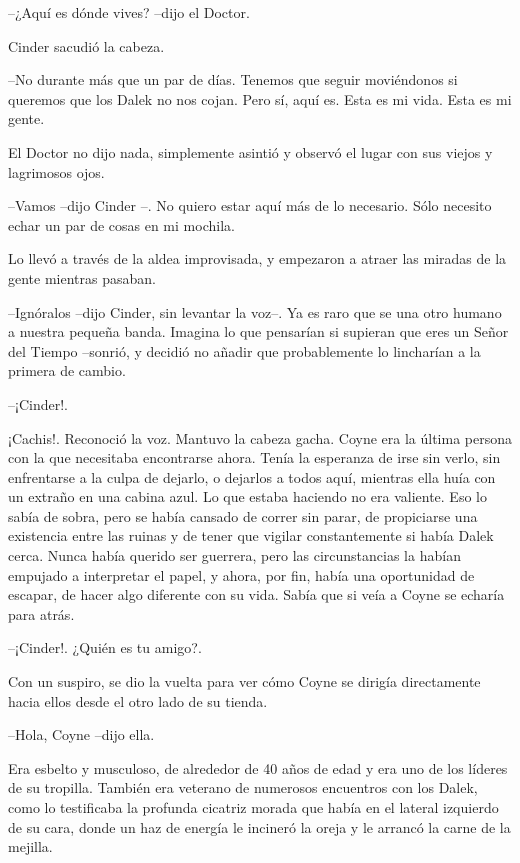 --¿Aquí es dónde vives? --dijo el Doctor.

Cinder sacudió la cabeza.

--No durante más que un par de días. Tenemos que seguir moviéndonos si queremos que los Dalek no nos cojan. Pero sí, aquí es. Esta es mi vida. Esta es mi gente.

El Doctor no dijo nada, simplemente asintió y observó el lugar con sus viejos y lagrimosos ojos.

--Vamos --dijo Cinder --. No quiero estar aquí más de lo necesario. Sólo necesito echar un par de cosas en mi mochila.

Lo llevó a través de la aldea improvisada, y empezaron a atraer las miradas de la gente mientras pasaban.

--Ignóralos --dijo Cinder, sin levantar la voz--. Ya es raro que se una otro humano a nuestra pequeña banda. Imagina lo que pensarían si supieran que eres un Señor del Tiempo --sonrió, y decidió no añadir que probablemente lo lincharían a la primera de cambio.

--¡Cinder!.

¡Cachis!. Reconoció la voz. Mantuvo la cabeza gacha. Coyne era la última persona con la que necesitaba encontrarse ahora. Tenía la esperanza de irse sin verlo, sin enfrentarse a la culpa de dejarlo, o dejarlos a todos aquí, mientras ella huía con un extraño en una cabina azul. Lo que estaba haciendo no era valiente. Eso lo sabía de sobra, pero se había cansado de correr sin parar, de propiciarse una existencia entre las ruinas y de tener que vigilar constantemente si había Dalek cerca. Nunca había querido ser guerrera, pero las circunstancias la habían empujado a interpretar el papel, y ahora, por fin, había una oportunidad de escapar, de hacer algo diferente con su vida. Sabía que si veía a Coyne se echaría para atrás.


--¡Cinder!. ¿Quién es tu amigo?.

Con un suspiro, se dio la vuelta para ver cómo Coyne se dirigía directamente hacia ellos desde el otro lado de su tienda.

--Hola, Coyne --dijo ella.

Era esbelto y musculoso, de alrededor de 40 años de edad y era uno de los líderes de su tropilla. También era veterano de numerosos encuentros con los Dalek, como lo testificaba la profunda cicatriz morada que había en el lateral izquierdo de su cara, donde un haz de energía le incineró la oreja y le arrancó la carne de la mejilla. 

